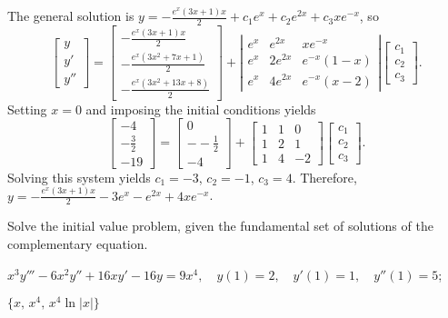 \documentclass{ximera}
\begin{document}
\begin{problem}
\begin{solution}
The general solution is
$y=-\frac{e^x(3x+1)x}{2}+c_1e^x+c_2e^{2x}+c_3xe^{-x}$, so
$$
\left[\begin{array}{l}
y\\y'\\y''
\end{array}\right]=
\left[\begin{array}{c}
-\frac{e^x(3x+1)x}{2}\\
-\frac{e^x(3x^2+7x+1)}{2}\\
-\frac{e^x(3x^2+13x+8)}{2}
\end{array}\right]+
\left|\begin{array}{cccc}
e^x&e^{2x}&xe^{-x}\\e^x&2e^{2x}&e^{-x}(1-x)\\e^x&4e^{2x}&e
^{-x}(x-2)\end{array}\right|
\left[\begin{array}{c}
c_{1}\\ c_{2}\\ c_{3}
\end{array}\right].
$$
Setting $x=0$  and imposing the initial conditions yields
$$
\left[\begin{array}{c}
-4\\-\frac{3}{2}\\-19
\end{array}\right]=
\left[\begin{array}{r}
0\\--\frac{1}{2}\\-4
\end{array}\right]+
\left[\begin{array}{rrr}
1&1&0\\ 1&2&1\\ 1&4&-2
\end{array}\right]
\left[\begin{array}{c}
c_{1}\\ c_{2}\\ c_{3}
\end{array}\right].
$$
Solving this system yields $c_1=-3$, $c_2=-1$, $c_3=4$.
Therefore,
$y=-\frac{e^x(3x+1)x}{2}-3e^x-e^{2x}+4xe^{-x}$.
\end{solution}
\end{problem}

\begin{problem}\label{exer:9.4.25}
Solve the
initial value problem, given the fundamental set of solutions of the complementary equation.

$x^3y'''-6x^2y''+16xy'-16y=9x^4, \quad  y(1)=2,\quad y'(1)=1,\quad y''(1)=5$;

 $\{x,\,x^4,\,x^4 \ln |x|\}$
\end{problem}
\end{document}
